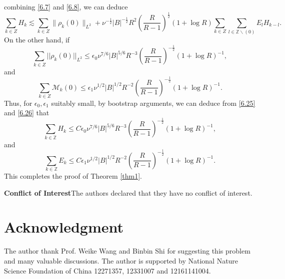 \documentclass[final, 12pt,reqno]{amsart}
\numberwithin{equation}{section}
\begin{document}
    combining \eqref{6.7} and \eqref{6.8}, we can deduce
    \begin{equation}\label{6.26}
    \sum_{k\in Z}H_k\lesssim \sum_{k\in Z}\|\rho_k(0)\|_{L^2}+\nu^{-\frac{1}{2}}|B|^{-\frac{1}{2}}R^2\left(\frac{R}{R-1}\right)^{\frac{1}{2}}(1+\log R)\sum_{k\in Z}\sum_{l \in \mathbb{Z} \backslash(0)}E_lH_{k-l}.
\end{equation}
    On the other hand, if   $$\sum_{k\in Z}||\rho_k(0)||_{L^2}\leq \epsilon_0\nu^{7/6}|B|^{5/6}R^{-3}\left(\frac{R}{R-1}\right)^{-\frac{1}{2}}(1+\log R)^{-1},$$ and $$\sum_{k\in Z}\mathcal{M}_k(0)\leq \epsilon_1\nu^{1/2}|B|^{1/2}R^{-2}\left(\frac{R}{R-1}\right)^{-\frac{1}{2}}(1+\log R)^{-1}.$$
    Thus, for $\epsilon_0,\epsilon_1$ suitably small, by bootstrap arguments, we can deduce  from \eqref{6.25} and \eqref{6.26} that
    $$\sum_{k\in\mathbb{Z}}H_k\leq C\epsilon_0\nu^{7/6}|B|^{5/6}R^{-3}\left(\frac{R}{R-1}\right)^{-\frac{1}{2}}(1+\log R)^{-1},$$ and
 $$\sum_{k\in\mathbb{Z}}E_k\leq C\epsilon_1\nu^{1/2}|B|^{1/2}R^{-2}\left(\frac{R}{R-1}\right)^{-\frac{1}{2}}(1+\log R)^{-1}.$$
    This completes the proof of Theorem \ref{thm1}.

    \textbf{Conflict of Interest}\quad The authors declared that they have no conflict of interest.
    \section{Acknowledgment}
The author thank Prof. Weike Wang and Binbin Shi for suggesting this
problem and many valuable discussions. The author is supported by
National Nature Science Foundation of China 12271357, 12331007 and
12161141004.
    
\end{document}
